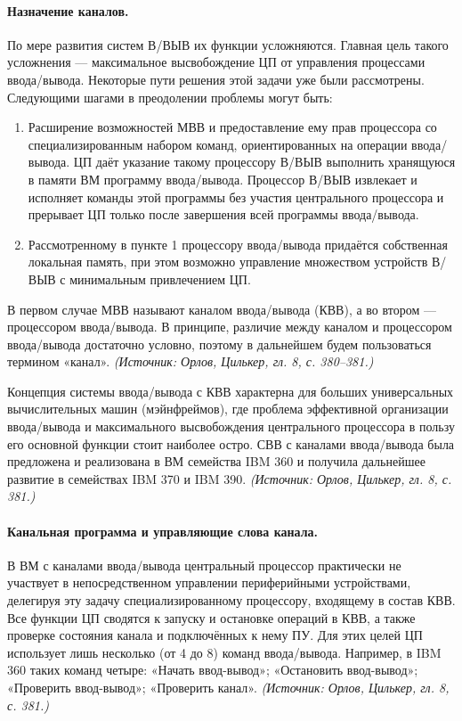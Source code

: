 \documentclass[a4paper,12pt]{article}
\begin{document}
\paragraph{Назначение каналов.}
По мере развития систем В/ВЫВ их функции усложняются. Главная цель такого усложнения — максимальное высвобождение ЦП от управления процессами ввода/вывода. Некоторые пути решения этой задачи уже были рассмотрены. Следующими шагами в преодолении проблемы могут быть:
\begin{enumerate}[label=\arabic*)]
\item Расширение возможностей МВВ и предоставление ему прав процессора со специализированным набором команд, ориентированных на операции ввода/вывода. ЦП даёт указание такому процессору В/ВЫВ выполнить хранящуюся в памяти ВМ программу ввода/вывода. Процессор В/ВЫВ извлекает и исполняет команды этой программы без участия центрального процессора и прерывает ЦП только после завершения всей программы ввода/вывода.
\item Рассмотренному в пункте 1 процессору ввода/вывода придаётся собственная локальная память, при этом возможно управление множеством устройств В/ВЫВ с минимальным привлечением ЦП.
\end{enumerate}
В первом случае МВВ называют каналом ввода/вывода (КВВ), а во втором — процессором ввода/вывода. В принципе, различие между каналом и процессором ввода/вывода достаточно условно, поэтому в дальнейшем будем пользоваться термином «канал».
\textit{(Источник: Орлов, Цилькер, гл. 8, с. 380--381.)}

Концепция системы ввода/вывода с КВВ характерна для больших универсальных вычислительных машин (мэйнфреймов), где проблема эффективной организации ввода/вывода и максимального высвобождения центрального процессора в пользу его основной функции стоит наиболее остро. СВВ с каналами ввода/вывода была предложена и реализована в ВМ семейства IBM 360 и получила дальнейшее развитие в семействах IBM 370 и IBM 390.
\textit{(Источник: Орлов, Цилькер, гл. 8, с. 381.)}

\paragraph{Канальная программа и управляющие слова канала.}
В ВМ с каналами ввода/вывода центральный процессор практически не участвует в непосредственном управлении периферийными устройствами, делегируя эту задачу специализированному процессору, входящему в состав КВВ. Все функции ЦП сводятся к запуску и остановке операций в КВВ, а также проверке состояния канала и подключённых к нему ПУ. Для этих целей ЦП использует лишь несколько (от 4 до 8) команд ввода/вывода. Например, в IBM 360 таких команд четыре: «Начать ввод-вывод»; «Остановить ввод-вывод»; «Проверить ввод-вывод»; «Проверить канал».
\textit{(Источник: Орлов, Цилькер, гл. 8, с. 381.)}
\end{document}
